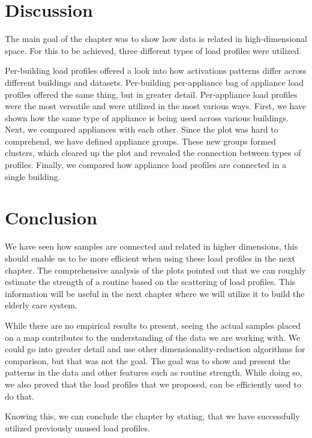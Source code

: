 \section{Discussion}

The main goal of the chapter was to show how data is related in high-dimensional space.
For this to be achieved, three different types of load profiles were utilized. 

Per-building load profiles offered a look into how activations patterns differ across different buildings and datasets.
Per-building per-appliance bag of appliance load profiles offered the same thing, but in greater detail.
Per-appliance load profiles were the most versatile and were utilized in the most various ways.
First, we have shown how the same type of appliance is being used across various buildings.
Next, we compared appliances with each other. 
Since the plot was hard to comprehend, we have defined appliance groups.
These new groups formed clusters, which cleared up the plot and revealed the connection between types of profiles. 
Finally, we compared how appliance load profiles are connected in a single building. 

\section{Conclusion}

We have seen how samples are connected and related in higher dimensions, this should enable us to be more efficient when using these load profiles in the next chapter. 
The comprehensive analysis of the plots pointed out that we can roughly estimate the strength of a routine based on the scattering of load profiles.
This information will be useful in the next chapter where we will utilize it to build the elderly care system.

While there are no empirical results to present, seeing the actual samples placed on a map contributes to the understanding of the data we are working with.
We could go into greater detail and use other dimensionality-reduction algorithms for comparison, but that was not the goal.
The goal was to show and present the patterns in the data and other features such as routine strength.
While doing so, we also proved that the load profiles that we proposed, can be efficiently used to do that.

Knowing this, we can conclude the chapter by stating, that we have successfully utilized previously unused load profiles.

